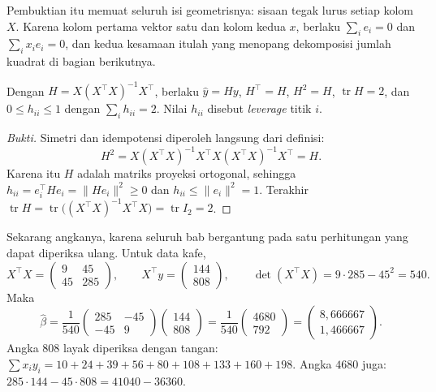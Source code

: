 Pembuktian itu memuat seluruh isi geometrisnya: sisaan tegak lurus setiap kolom $X$.
Karena kolom pertama vektor satu dan kolom kedua $x$, berlaku $\sum_i e_i=0$ dan
$\sum_i x_ie_i=0$, dan kedua kesamaan itulah yang menopang dekomposisi jumlah kuadrat
di bagian berikutnya.

\begin{proposisi}
Dengan $H=X(X^{\top}X)^{-1}X^{\top}$, berlaku $\hat y=Hy$, $H^{\top}=H$, $H^2=H$,
$\operatorname{tr}H=2$, dan $0\le h_{ii}\le1$ dengan $\sum_i h_{ii}=2$. Nilai $h_{ii}$
disebut \emph{leverage} titik $i$.
\end{proposisi}

\begin{proof}[Bukti]
Simetri dan idempotensi diperoleh langsung dari definisi:
\[
H^2=X(X^{\top}X)^{-1}X^{\top}X(X^{\top}X)^{-1}X^{\top}=H .
\]
Karena itu $H$ adalah matriks proyeksi ortogonal,
sehingga $h_{ii}=e_i^{\top}He_i=\|He_i\|^2\ge0$ dan $h_{ii}\le\|e_i\|^2=1$. Terakhir
$\operatorname{tr}H=\operatorname{tr}\bigl((X^{\top}X)^{-1}X^{\top}X\bigr)
=\operatorname{tr}I_2=2$.
\end{proof}

Sekarang angkanya, karena seluruh bab bergantung pada satu perhitungan yang dapat
diperiksa ulang. Untuk data kafe,
\[
X^{\top}X=\begin{pmatrix}9&45\\45&285\end{pmatrix},
\qquad X^{\top}y=\begin{pmatrix}144\\808\end{pmatrix},
\qquad \det(X^{\top}X)=9\cdot285-45^2=540 .
\]
Maka
\[
\hat\beta=\frac1{540}\begin{pmatrix}285&-45\\-45&9\end{pmatrix}
\begin{pmatrix}144\\808\end{pmatrix}
=\frac1{540}\begin{pmatrix}4680\\792\end{pmatrix}
=\begin{pmatrix}8{,}666667\\1{,}466667\end{pmatrix}.
\]
Angka $808$ layak diperiksa dengan tangan: $\sum x_iy_i=10+24+39+56+80+108+133+160+198$.
Angka $4680$ juga: $285\cdot144-45\cdot808=41040-36360$.

